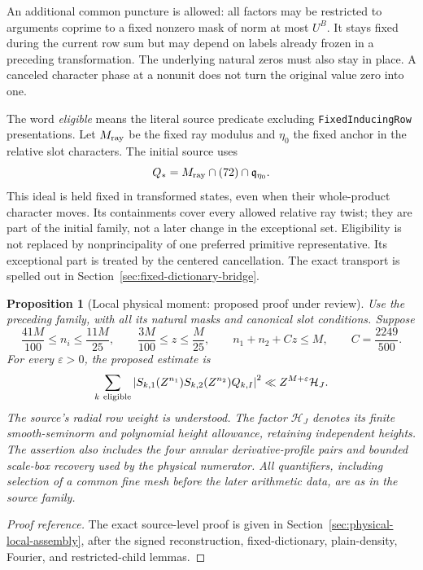 \documentclass[11pt]{article}
\newtheorem{proposition}{Proposition}[section]
\theoremstyle{definition}
\newcommand{\eps}{\varepsilon}
\newcommand{\code}[1]{\texttt{\small #1}}
\begin{document}
An additional common puncture is allowed: all factors may be restricted
to arguments coprime to a fixed nonzero mask of norm at most $U^B$.
It stays fixed during the current row sum but may depend on labels
already frozen in a preceding transformation. The underlying natural
zeros must also stay in place. A canceled character phase at a nonunit
does not turn the original value zero into one.

The word \emph{eligible} means the literal source predicate excluding
\code{FixedInducingRow} presentations. Let $M_{\rm ray}$ be the fixed
ray modulus and $\eta_0$ the fixed anchor in the relative slot characters.
The initial source uses
\[
 Q_* = M_{\rm ray}\cap(72)\cap\mathfrak q_{\eta_0}.
\]
This ideal is held fixed in transformed states, even when their
whole-product character moves. Its containments cover every allowed
relative ray twist; they are part of the initial family, not a later
change in the exceptional set. Eligibility is not replaced by
nonprincipality of one preferred primitive representative. Its exceptional
part is treated by the centered cancellation. The exact transport is
spelled out in Section~\ref{sec:fixed-dictionary-bridge}.

\begin{proposition}[Local physical moment: proposed proof under review]\label{hyp:local}
Use the preceding family, with all its natural masks and canonical slot
conditions. Suppose
\begin{equation}\label{eq:window}
 \frac{41M}{100}\le n_i\le\frac{11M}{25},\qquad
 \frac{3M}{100}\le z\le\frac M{25},\qquad
 n_1+n_2+Cz\le M,\qquad C=\frac{2249}{500}.
\end{equation}
For every $\eps>0$, the proposed estimate is
\begin{equation}\label{eq:moment}
 \sum_{k\ {\rm eligible}}
 \left|S_{k,1}(Z^{n_1})S_{k,2}(Z^{n_2})Q_{k,I}\right|^2
 \ll Z^{M+\eps}\mathcal H_J.
\end{equation}
The source's radial row weight is understood. The factor $\mathcal H_J$
denotes its finite smooth-seminorm and polynomial height allowance,
retaining independent heights. The assertion also includes the four
annular derivative-profile pairs and bounded scale-box recovery used by
the physical numerator. All quantifiers, including selection of a common
fine mesh before the later arithmetic data, are as in the source family.
\end{proposition}
\begin{proof}[Proof reference]
The exact source-level proof is given in
Section~\ref{sec:physical-local-assembly}, after the signed reconstruction,
fixed-dictionary, plain-density, Fourier, and restricted-child lemmas.
\end{proof}
\end{document}
